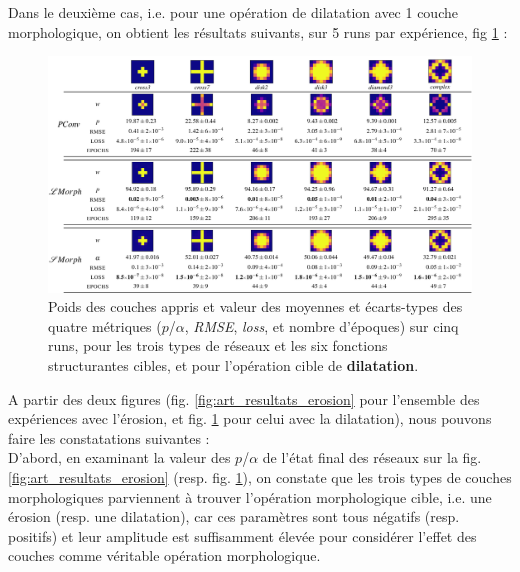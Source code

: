 \newpage

Dans le deuxième cas, i.e. pour une opération de dilatation avec 1 couche morphologique, on obtient les résultats suivants, sur 5 runs par expérience, fig \ref{fig:art_resultats_dilation} :

\vspace{2.0mm}
\begin{figure}[ht]
  \begin{center}
    \includegraphics[width=1.00\textwidth]{parts/2-etat_de_lart/D-efficacite_des_reseaux_existant/figures/art_dilation.png}
    \vspace{-2.0mm}
    \caption{ \centering Poids des couches appris et valeur des moyennes et écarts-types des quatre métriques ($p$/$\alpha$, \textit{RMSE}, \textit{loss}, et nombre d'époques) sur cinq runs, pour les trois types de réseaux et les six fonctions structurantes cibles, et pour l'opération cible de \textbf{dilatation}.}
    \label{fig:art_resultats_dilation}
  \end{center}
\end{figure}

\vspace{1.0mm}
A partir des deux figures (fig. \ref{fig:art_resultats_erosion} pour l'ensemble des expériences avec l'érosion, et fig. \ref{fig:art_resultats_dilation} pour celui avec la dilatation), nous pouvons faire les constatations suivantes : \\

\noindent D'abord, en examinant la valeur des $p$/$\alpha$ de l'état final des réseaux sur la fig. \ref{fig:art_resultats_erosion} (resp. fig. \ref{fig:art_resultats_dilation}), on constate que les trois types de couches morphologiques parviennent à trouver l'opération morphologique cible, i.e. une érosion (resp. une dilatation), car ces paramètres sont tous négatifs (resp. positifs) et leur amplitude est suffisamment élevée pour considérer l'effet des couches comme véritable opération morphologique. \\


